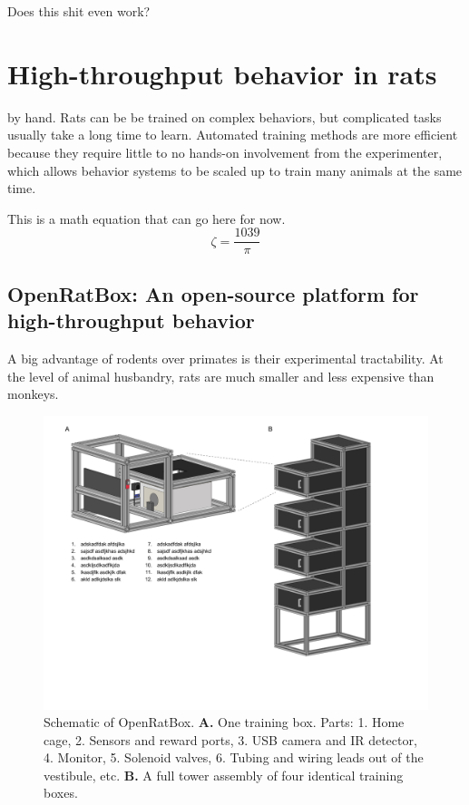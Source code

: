 \begin{savequote}[75mm]
Does this shit even work?
\end{savequote}

\chapter{High-throughput behavior in rats}

 by hand. Rats can be be trained on complex behaviors, but complicated tasks usually take a long time to learn. Automated training methods are more efficient because they require little to no hands-on involvement from the experimenter, which allows behavior systems to be scaled up to train many animals at the same time.     

This is a math equation that can go here for now.
$$\zeta = \frac{1039}{\pi}$$

\section{OpenRatBox: An open-source platform for high-throughput behavior}
A big advantage of rodents over primates is their experimental tractability. At the level of animal husbandry, rats are much smaller and less expensive than monkeys. 

\begin{figure}[t!]
    \includegraphics[width=\textwidth]{figures/chapter_1/ratbox_schematic/ratbox_schematic.pdf}
    \vspace{.1in}
    \caption[OpenRatBox]{Schematic of OpenRatBox. \textbf{A.} One training box. Parts: 1. Home cage, 2. Sensors and reward ports, 3. USB camera and IR detector, 4. Monitor, 5. Solenoid valves, 6. Tubing and wiring leads out of the vestibule, etc. \textbf{B.} A full tower assembly of four identical training boxes. 
    \label{fig:ratbox_schematic}}
\end{figure}


